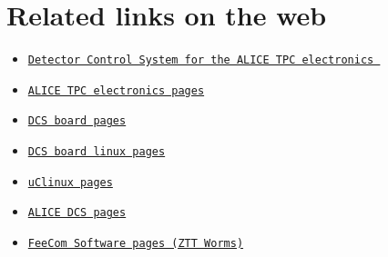 \hypertarget{main_mpg_links}{}\section{Related links on the web}\label{main_mpg_links}
\begin{itemize}
\item \href{http://www.ift.uib.no/~kjeks/wiki/index.php?title=Detector_Control_System_%28DCS%29_for_ALICE_Front-end_electronics}{\tt Detector Control System for the ALICE TPC electronics }\item \href{http://ep-ed-alice-tpc.web.cern.ch/ep-ed-alice-tpc/}{\tt ALICE TPC electronics pages}\item \href{http://www.kip.uni-heidelberg.de/ti/DCS-Board/current/}{\tt DCS board pages}\item \href{http://www.}{\tt DCS board linux pages}\item \href{http://www.}{\tt u\-Clinux pages}\item \href{http://alicedcs.web.cern.ch/AliceDCS/}{\tt ALICE DCS pages}\item \href{http://www.ztt.fh-worms.de/en/projects/Alice-FEEControl/index.shtml}{\tt Fee\-Com Software pages (ZTT Worms)} \end{itemize}
